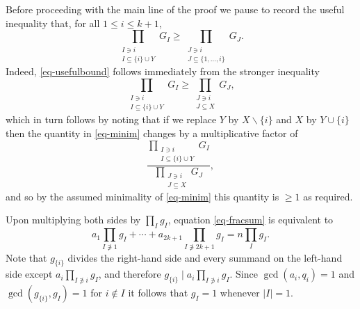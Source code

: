 \documentclass[11pt,letterpaper]{amsart}
\newcommand{\abs}[1]{\left\lvert #1\right\rvert}
\newcommand{\ogcd}[2]{\gcd(#1,#2)}
\theoremstyle{definition}
\begin{document}
Before proceeding with the main line of the proof we pause to record the useful inequality that, for all $1\leq i\leq k+1$,
\begin{equation}\label{eq-usefulbound}
\prod_{\substack{I\ni i\\I\subseteq\{i\}\cup Y}}G_I\geq \prod_{\substack{J\ni i\\ J\subseteq \{1,\ldots,i\}}}G_{J}.
\end{equation}
Indeed, \eqref{eq-usefulbound} follows immediately from the stronger inequality
\[\prod_{\substack{I\ni i \\I\subseteq \{i\}\cup Y}}G_I\geq \prod_{\substack{J\ni i\\ J\subseteq X}}G_{J},\]
which in turn follows by noting that if we replace $Y$ by $X\backslash \{i\}$ and $X$ by $Y\cup \{i\}$ then the quantity in \eqref{eq-minim} changes by a multiplicative factor of
\[\frac{\prod_{\substack{I\ni i\\I\subseteq \{i\}\cup Y}}G_I}{\prod_{\substack{J\ni i\\ J\subseteq X}}G_{J}},\]
and so by the assumed minimality of \eqref{eq-minim} this quantity is $\geq 1$ as required.


Upon multiplying both sides by $\prod_I g_I$, equation \eqref{eq-fracsum} is equivalent to
\begin{equation}\label{eq-simpsum}
a_1\prod_{I\not \ni 1}g_I+\cdots +a_{2k+1}\prod_{I\not \ni 2k+1}g_I= n\prod_I g_I.
\end{equation}
Note that $g_{\{i\}}$ divides the right-hand side and every summand on the left-hand side except $a_i\prod_{I\not\ni i}g_I$, and therefore $g_{\{i\}}\mid a_i\prod_{I\not\ni i}g_I$. Since $\ogcd{a_i}{q_i}=1$ and $\ogcd{g_{\{i\}}}{g_I}=1$ for $i\not\in I$ it follows that $g_{I}=1$ whenever $\abs{I}=1$. 
\end{document}
